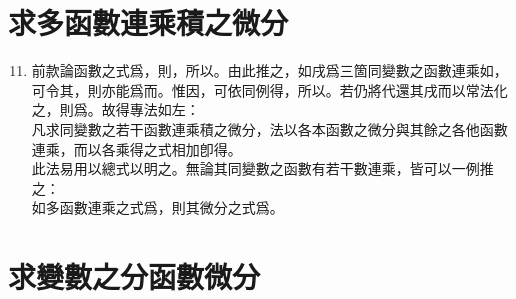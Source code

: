 \section{求多函數連乘積之微分}

\begin{enumerate} [label={第\chinese*款},nolistsep]
	\setcounter{enumi}{10}
	\item 前款論函數之式爲\CJKmove，則\CJKmove，所以\CJKmove。由此推之，如戌爲三箇同變數之函數連乘如\CJKmove，可令其\CJKmove，則亦能爲\CJKmove 而\CJKmove。惟因\CJKmove，可依同例得\CJKmove，所以\CJKmove。若仍將\CJKmove 代還其戌而以常法化之，則爲\CJKmove。故得專法如左：\\
	凡求同變數之若干函數連乘積之微分，法以各本函數之微分與其餘之各他函數連乘，而以各乘得之式相加卽得。\\
	此法易用以總式以明之。無論其同變數之函數有若干數連乘，皆可以一例推之：\\
	如多函數連乘之式爲\CJKmove，則其微分之式爲\CJKmove。
\end{enumerate}

\section{求變數之分函數微分}

